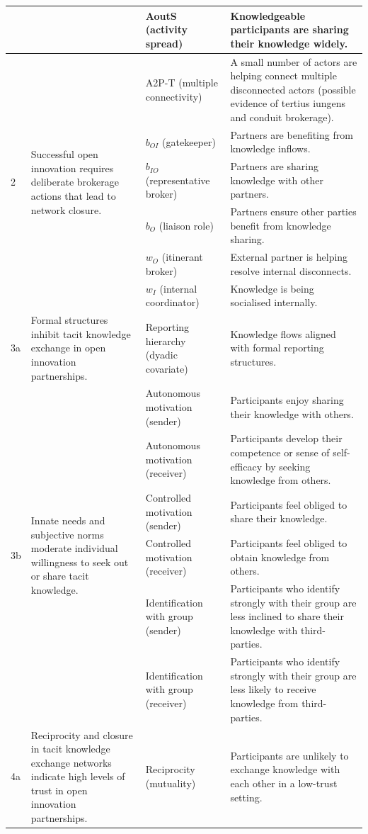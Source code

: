 \begin{table}
{\begin{tabular}{p{0.5cm} p{6cm} p{6cm} p{8cm}}
& & AoutS (activity spread) & Knowledgeable participants are sharing their knowledge widely. \\ \midrule
\multirow[t]{6}{=}{2} & \multirow[t]{6}{=}{Successful open innovation requires deliberate brokerage actions that lead to network closure.} & A2P-T (multiple connectivity) & A small number of actors are helping connect multiple disconnected actors (possible evidence of tertius iungens and conduit brokerage). \\
& & $b_{OI}$ (gatekeeper) & Partners are benefiting from knowledge inflows. \\
& & $b_{IO}$ (representative broker) & Partners are sharing knowledge with other partners. \\
& & $b_O$ (liaison role) & Partners ensure other parties benefit from knowledge sharing. \\
& & $w_O$ (itinerant broker) & External partner is helping resolve internal disconnects. \\
& & $w_I$ (internal coordinator) & Knowledge is being socialised internally. \\ \midrule
3a & Formal structures inhibit tacit knowledge exchange in open innovation partnerships. & Reporting hierarchy (dyadic covariate) & Knowledge flows aligned with formal reporting structures. \\ \midrule
\multirow[t]{6}{=}{3b} & \multirow[t]{6}{=}{Innate needs and subjective norms moderate individual willingness to seek out or share tacit knowledge.} &
Autonomous motivation (sender) & Participants enjoy sharing their knowledge with others. \\
& & Autonomous motivation (receiver) & Participants develop their competence or sense of self-efficacy by seeking knowledge from others. \\
& & Controlled motivation (sender) & Participants feel obliged to share their knowledge. \\
& & Controlled motivation (receiver) & Participants feel obliged to obtain knowledge from others. \\
& & Identification with group (sender) & Participants who identify strongly with their group are less inclined to share their knowledge with third-parties. \\
& & Identification with group (receiver) & Participants who identify strongly with their group are less likely to receive knowledge from third-parties. \\ \midrule
\multirow[t]{3}{=}{4a} & \multirow[t]{3}{=}{Reciprocity and closure in tacit knowledge exchange networks indicate high levels of trust in open innovation partnerships.} & Reciprocity (mutuality) & Participants are unlikely to exchange knowledge with each other in a low-trust setting. \\

\end{tabular}}
\end{table}
